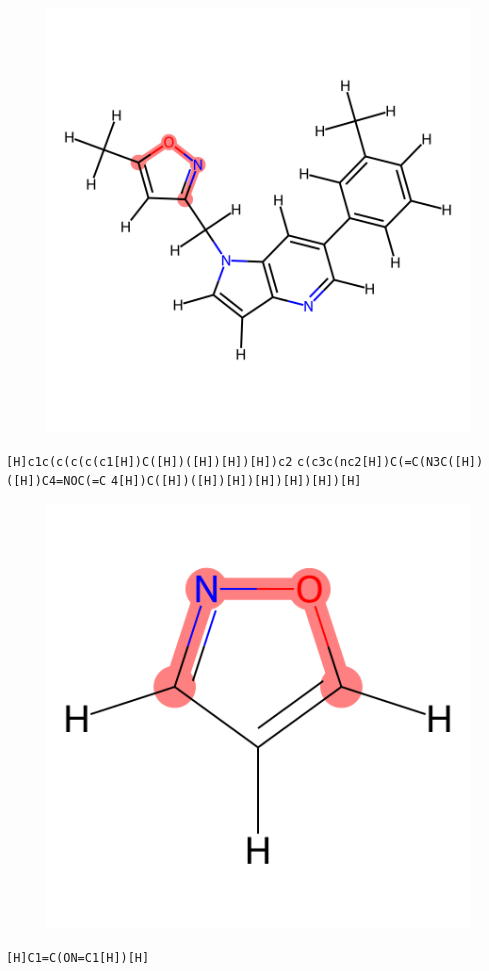 \documentclass{article}
\begin{document}
\begin{figure}[ht]
\centering
    \includegraphics{mol12.png}
\end{figure}
\verb|[H]c1c(c(c(c(c1[H])C([H])([H])[H])[H])c2| \verb|c(c3c(nc2[H])C(=C(N3C([H])([H])C4=NOC(=C| \verb|4[H])C([H])([H])[H])[H])[H])[H])[H]|

\begin{figure}[ht]
\centering
    \includegraphics{mol13.png}
\end{figure}
\verb|[H]C1=C(ON=C1[H])[H]|
\end{document}
